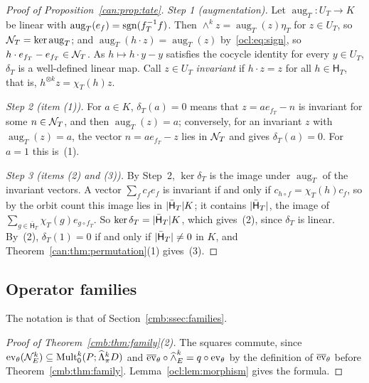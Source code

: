 \begin{proof}[Proof of Proposition~\ref{can:prop:tate}]
\emph{Step 1 (augmentation).} Let $\operatorname{aug}_T\colon U_T\to K$ be linear with
$\operatorname{aug}_T(e_f)=\operatorname{sgn}(f_T^{-1}f)$. Then $\wedge^kz=\operatorname{aug}_T(z)\eta_T$ for $z\in U_T$, so
$\mathcal N_T=\ker\operatorname{aug}_T$; and $\operatorname{aug}_T(h\cdot z)=\operatorname{aug}_T(z)$ by~\eqref{ocl:eq:sign}, so
$h\cdot e_{f_T}-e_{f_T}\in\mathcal N_T$. As $h\mapsto h\cdot y-y$ satisfies the cocycle identity for every $y\in U_T$,
$\delta_T$ is a well-defined linear map. Call $z\in U_T$ \emph{invariant} if $h\cdot z=z$ for all $h\in\mathsf H_T$,
that is, $h^{\otimes k}z=\chi_T(h)z$.

\emph{Step 2 (item (1)).} For $a\in K$, $\delta_T(a)=0$ means that $z=ae_{f_T}-n$ is invariant for some $n\in\mathcal N_T$, and
then $\operatorname{aug}_T(z)=a$; conversely, for an invariant $z$ with $\operatorname{aug}_T(z)=a$, the vector
$n=ae_{f_T}-z$ lies in $\mathcal N_T$ and gives $\delta_T(a)=0$. For $a=1$ this is~(1).

\emph{Step 3 (items (2) and (3)).} By Step~2, $\ker\delta_T$ is the image under $\operatorname{aug}_T$ of the invariant
vectors. A vector $\sum_fc_fe_f$ is invariant if and only if $c_{h\circ f}=\chi_T(h)c_f$, so by the orbit count this
image lies in $\lvert \bar{\mathsf H}_T\rvert K$; it contains $\lvert \bar{\mathsf H}_T\rvert$, the image of $\sum_{g\in\bar{\mathsf
H}_T}\chi_T(g)e_{g\circ f_T}$. So $\ker\delta_T=\lvert \bar{\mathsf H}_T\rvert K$, which gives~(2), since $\delta_T$ is linear.
By~(2), $\delta_T(1)=0$ if and only if $\lvert \bar{\mathsf H}_T\rvert\ne0$ in $K$, and Theorem~\ref{can:thm:permutation}(1)
gives~(3).
\end{proof}

\subsection{Operator families}\label{ocl:ssec:families}

The notation is that of Section~\ref{cmb:ssec:families}.

\begin{proof}[Proof of Theorem~\ref{cmb:thm:family}(2)]
The squares commute, since $\operatorname{ev}_\theta(\mathcal N^k_E)\subseteq\operatorname{Mult}^k_0(P;\widehat\Lambda^k_\pi D)$ and
$\overline{\operatorname{ev}}_\theta\circ\widehat\wedge^k_E=q\circ\operatorname{ev}_\theta$ by the definition of $\overline{\operatorname{ev}}_\theta$ before
Theorem~\ref{cmb:thm:family}. Lemma~\ref{ocl:lem:morphism} gives the formula.
\end{proof}

